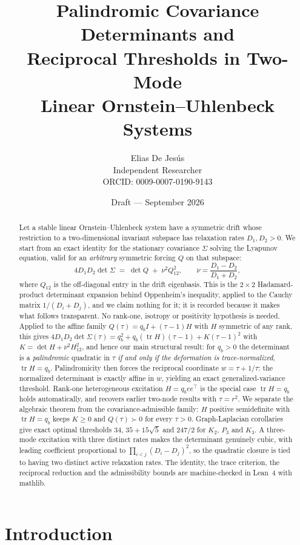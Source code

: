 \documentclass[11pt]{article}
\title{Palindromic Covariance Determinants and\\
Reciprocal Thresholds in Two-Mode\\
Linear Ornstein--Uhlenbeck Systems}
\author{Elias De Jes\'us\\
Independent Researcher\\
ORCID: 0009-0007-0190-9143}
\date{Draft --- September 2026}
\theoremstyle{plain}
\theoremstyle{definition}
\theoremstyle{remark}
\newcommand{\tr}{\operatorname{tr}}
\newcommand{\Sig}{\Sigma}
\newcommand{\T}{^{\!\top}}
\begin{document}
\maketitle

\begin{abstract}
Let a stable linear Ornstein--Uhlenbeck system have a symmetric drift whose restriction to a
two-dimensional invariant subspace has relaxation rates $D_1,D_2>0$. We start from an exact
identity for the stationary covariance $\Sig$ solving the Lyapunov equation, valid for an
\emph{arbitrary} symmetric forcing $Q$ on that subspace:
\[
  4D_1D_2\det\Sig \;=\; \det Q \;+\; \nu^2 Q_{12}^2,
  \qquad \nu=\frac{D_1-D_2}{D_1+D_2},
\]
where $Q_{12}$ is the off-diagonal entry in the drift eigenbasis. This is the $2\times2$
Hadamard-product determinant expansion behind Oppenheim's inequality, applied to the Cauchy
matrix $1/(D_i+D_j)$, and we claim nothing for it; it is recorded because it makes what follows
transparent. No rank-one, isotropy or positivity hypothesis is needed. Applied to the affine family
$Q(\tau)=q_bI+(\tau-1)H$ with $H$ symmetric of any rank, this gives
$4D_1D_2\det\Sig(\tau)=q_b^2+q_b(\tr H)(\tau-1)+K(\tau-1)^2$ with $K=\det H+\nu^2H_{12}^2$, and
hence our main structural result: for $q_b>0$ the determinant is a \emph{palindromic} quadratic
in $\tau$ \emph{if and only if the deformation is trace-normalized}, $\tr H=q_b$. Palindromicity
then forces the reciprocal coordinate $w=\tau+1/\tau$: the normalized determinant is exactly
affine in $w$, yielding an exact generalized-variance threshold. Rank-one heterogeneous
excitation $H=q_be e\T$ is the special case $\tr H=q_b$ holds automatically, and recovers
earlier two-node results with $\tau=r^2$. We separate the algebraic theorem from the
covariance-admissible family: $H$ positive semidefinite with $\tr H=q_b$ keeps $K\ge0$ and
$Q(\tau)\succ0$ for every $\tau>0$. Graph-Laplacian corollaries give exact optimal thresholds
$34$, $35+15\sqrt5$ and $247/2$ for $K_2$, $P_3$ and $K_3$. A three-mode excitation with three
distinct rates makes the determinant genuinely cubic, with leading coefficient proportional to
$\prod_{i<j}(D_i-D_j)^2$, so the quadratic closure is tied to having two distinct active
relaxation rates. The identity, the trace criterion, the reciprocal reduction and the
admissibility bounds are machine-checked in Lean~4 with mathlib.
\end{abstract}

\section{Introduction}\label{sec:intro}
\end{document}
